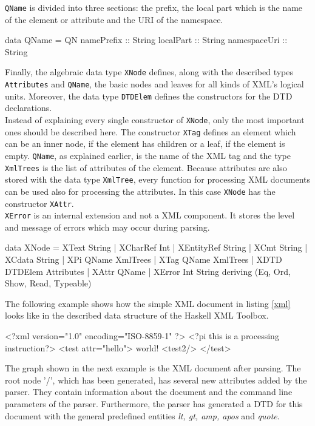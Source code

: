 \documentclass[11pt,a4paper,headsepline, bibtotoc]{scrreprt}
\begin{document}
{\tt QName} is divided into three sections: the prefix, the local part which is the name of the element or attribute and the URI of the namespace. 
\begin{code}
data QName = QN {
  namePrefix   :: String
  localPart    :: String
  namespaceUri :: String
}
\end{code} 
Finally, the algebraic data type {\tt XNode} defines, along with the described types {\tt Attributes} and {\tt QName}, the basic nodes and leaves for all kinds of XML's logical units. Moreover, the data type {\tt DTDElem} defines the constructors for the DTD declarations.\\
Instead of explaining every single constructor of {\tt XNode}, only the most important ones should be described here. The constructor {\tt XTag} defines an element which can be an inner node, if the element has children or a leaf, if the element is empty. {\tt QName}, as explained earlier, is the name of the XML tag and the type {\tt XmlTrees} is the list of attributes of the element. Because attributes are also stored with the data type {\tt XmlTree}, every function for processing XML documents can be used also for processing the attributes. In this case {\tt XNode} has the constructor {\tt XAttr}.\\
{\tt XError} is an internal extension and not a XML component. It stores the level and message of errors which may occur during parsing. 
\begin{code}
data XNode
= XText String
| XCharRef Int
| XEntityRef String
| XCmt String
| XCdata String
| XPi QName XmlTrees
| XTag QName XmlTrees
| XDTD DTDElem Attributes
| XAttr QName
| XError Int String
deriving (Eq, Ord, Show, Read, Typeable)
\end{code}
The following example shows how the simple XML document in listing \ref{xml} looks like in the described data structure of the Haskell XML Toolbox.
\begin{blank}[language={XML},caption={Simple XML Document},label=xml]
<?xml version="1.0" encoding="ISO-8859-1" ?>
<?pi this is a processing instruction?>
<test attr="hello">
	world!
	<test2/>
</test>
\end{blank}
The graph shown in the next example is the XML document after parsing. The root node '/', which has been generated, has several new attributes added by the parser. They contain information about the document and the command line parameters of the parser. Furthermore, the parser has generated a DTD for this document with the general predefined entities {\it lt, gt, amp, apos} and {\it quote}.
\end{document}

